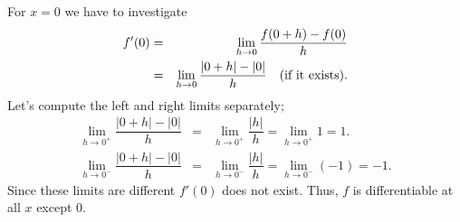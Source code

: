 \documentclass[titlepage,a4paper,12pt]{report}
\begin{document}
\noindent For $x=0$ we have to investigate 
\begin{eqnarray*}
f'(0) &=& \lim _{h\rightarrow 0}\dfrac{f(0+h)-f(0)}{h}\\
&=& \lim _{h\rightarrow 0} \dfrac{|0+h|-|0|}{h} \quad (\hbox{if it exists}). 
\end{eqnarray*}
Let's compute the left and right limits separately;
\begin{eqnarray*}
\lim _{h\rightarrow 0^+} \dfrac{|0+h|-|0|}{h} &=& \lim _{h\rightarrow 0^+}\dfrac{|h|}{h}=\lim _{h\rightarrow 0^+} 1=1.\\
\lim _{h\rightarrow 0^-} \dfrac{|0+h|-|0|}{h} &=& \lim _{h\rightarrow 0^-}\dfrac{|h|}{h}=\lim _{h\rightarrow 0^-} (-1)=-1.
\end{eqnarray*}
Since these limits are different $f'(0)$ does not exist.  Thus, $f$ is differentiable at all $x$ except $0$.
\end{document}
